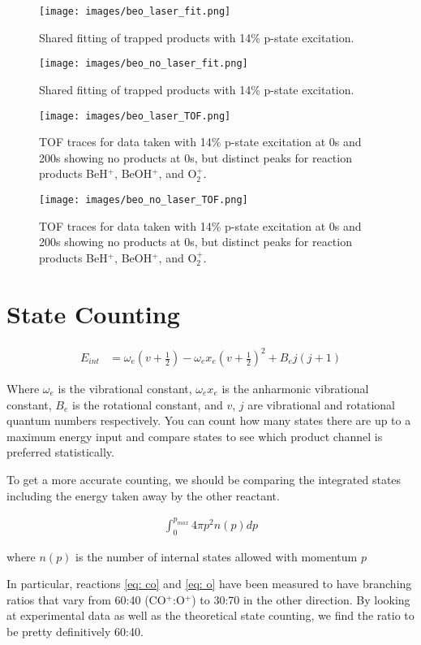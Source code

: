 \begin{figure}[H]
\centering
\texttt{[image: images/beo\_laser\_fit.png]}
\caption{\label{fig: laser fit} Shared fitting of trapped products with 14\% p-state excitation.}
\end{figure}

\begin{figure}[H]
\centering
\texttt{[image: images/beo\_no\_laser\_fit.png]}
\caption{\label{fig: no laser fit} Shared fitting of trapped products with 14\% p-state excitation.}
\end{figure}

\begin{figure}[H]
\centering
\texttt{[image: images/beo\_laser\_TOF.png]}
\caption{\label{fig: laser TOF} TOF traces for data taken with 14\% p-state excitation at 0s and 200s showing no products at 0s, but distinct peaks for reaction products BeH$^+$, BeOH$^+$, and O$_2^+$.}
\end{figure}

\begin{figure}[H]
\centering
\texttt{[image: images/beo\_no\_laser\_TOF.png]}
\caption{\label{fig: non laser TOF} TOF traces for data taken with 14\% p-state excitation at 0s and 200s showing no products at 0s, but distinct peaks for reaction products BeH$^+$, BeOH$^+$, and O$_2^+$.}
\end{figure}

\section{State Counting}

\begin{align}
E_{int} & = \omega_e\left(v + \frac{1}{2}\right) - \omega_ex_e\left(v+\frac{1}{2}\right)^2 + B_ej(j+1)
\end{align}

Where $\omega_e$ is the vibrational constant, $\omega_ex_e$ is the anharmonic vibrational constant, $B_e$ is the rotational constant, and $v$, $j$ are vibrational and rotational quantum numbers respectively. You can count how many states there are up to a maximum energy input and compare states to see which product channel is preferred statistically.

To get a more accurate counting, we should be comparing the integrated states including the energy taken away by the other reactant.

\begin{align}
\int_0^{p_{max}}4\pi p^2 n(p) dp
\end{align}

where $n(p)$ is the number of internal states allowed with momentum $p$


In particular, reactions \ref{eq: co} and \ref{eq: o} have been measured to have branching ratios that vary from 60:40 (CO$^+$:O$^+$) to 30:70 in the other direction. By looking at experimental data as well as the theoretical state counting, we find the ratio to be pretty definitively 60:40.